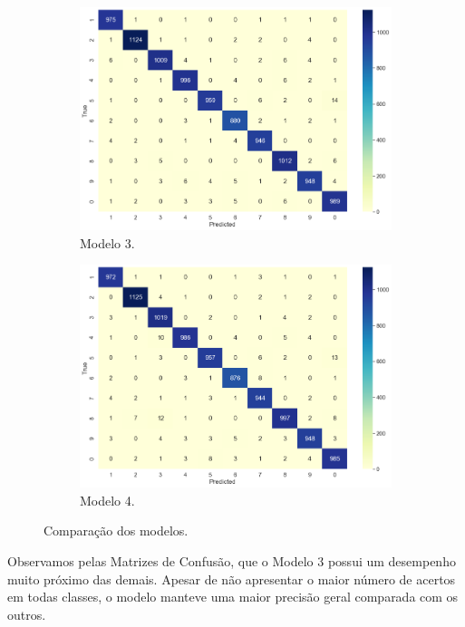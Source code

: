 \documentclass[12pt]{article}
\begin{document}
\begin{figure}[H]
	\begin{subfigure}{0.4\linewidth}
		\centering
		\includegraphics[width=\linewidth]{Imagens/mlp_model3_conf.png}
		\caption{Modelo 3.}
		\label{fig:mlp_model3_conf}
	\end{subfigure}
		\begin{subfigure}{0.4\linewidth}
		\centering
		\includegraphics[width=\linewidth]{Imagens/mlp_model4_conf.png}
		\caption{Modelo 4.}
		\label{fig:mlp_model4_conf}
	\end{subfigure}
	\caption{Comparação dos modelos.}
	\label{fig:conf_models}
\end{figure}

Observamos pelas Matrizes de Confusão, que o Modelo 3 possui um desempenho muito próximo das demais. Apesar de não apresentar o maior número de acertos em todas classes, o modelo manteve uma maior precisão geral comparada com os outros.
\end{document}
